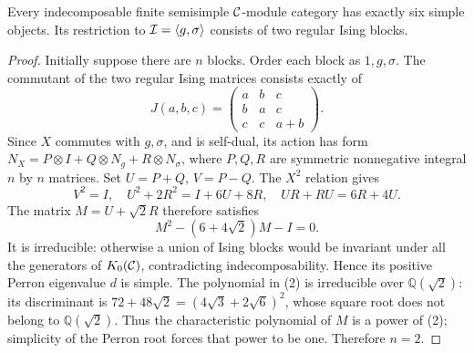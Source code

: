\begin{theorem}
Every indecomposable finite semisimple $\mathcal C$-module category has exactly
six simple objects. Its restriction to $\mathcal I=\langle g,\sigma\rangle$
consists of two regular Ising blocks.
\end{theorem}
\begin{proof}
Initially suppose there are $n$ blocks. Order each block as $1,g,\sigma$.
The commutant of the two regular Ising matrices consists exactly of
\[
J(a,b,c)=\begin{pmatrix}a&b&c\\b&a&c\\c&c&a+b\end{pmatrix}.
\]
Since $X$ commutes with $g,\sigma$, and is self-dual, its action has form
$N_X=P\otimes I+Q\otimes N_g+R\otimes N_\sigma$,
where $P,Q,R$ are symmetric nonnegative integral $n$ by $n$ matrices.
Set $U=P+Q$, $V=P-Q$. The $X^2$ relation gives
\[
V^2=I,\quad U^2+2R^2=I+6U+8R,\quad UR+RU=6R+4U. \tag{1}
\]
The matrix $M=U+\sqrt2R$ therefore satisfies
\[
M^2-(6+4\sqrt2)M-I=0. \tag{2}
\]
It is irreducible: otherwise a union of Ising blocks would be invariant
under all the generators of $K_0(\mathcal C)$, contradicting indecomposability.
Hence its positive Perron eigenvalue $d$ is simple. The polynomial in
(2) is irreducible over $\mathbb Q(\sqrt2)$: its discriminant is
$72+48\sqrt2=(4\sqrt3+2\sqrt6)^2$, whose square root does not belong
to $\mathbb Q(\sqrt2)$. Thus the characteristic polynomial of $M$ is a
power of (2); simplicity of the Perron root forces that power to be one.
Therefore $n=2$.
\end{proof}

